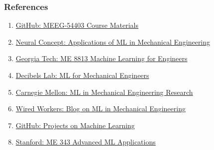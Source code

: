 \begin{frame}[fragile]\frametitle{References}
    \begin{enumerate}
        \item \href{https://github.com/hanhuark/MEEG-54403}{GitHub: MEEG-54403 Course Materials}
        \item \href{https://www.neuralconcept.com/post/applications-of-machine-learning-in-mechanical-engineering}{Neural Concept: Applications of ML in Mechanical Engineering}
        \item \href{https://msse.gatech.edu/me8813ML/index.html}{Georgia Tech: ME 8813 Machine Learning for Engineers}
        \item \href{https://lms.decibelslab.com/courses/Machine-Learning-for-Mechanical-Engineers}{Decibels Lab: ML for Mechanical Engineers}
        \item \href{https://www.meche.engineering.cmu.edu/research/machine-learning.html}{Carnegie Mellon: ML in Mechanical Engineering Research}
        \item \href{https://www.wiredworkers.io/blog/machine-learning-in-mechanical-engineering/}{Wired Workers: Blog on ML in Mechanical Engineering}
        \item \href{https://github.com/Parnni/Projects}{GitHub: Projects on Machine Learning}
        \item \href{https://stanford-me343.github.io}{Stanford: ME 343 Advanced ML Applications}
    \end{enumerate}
\end{frame}
